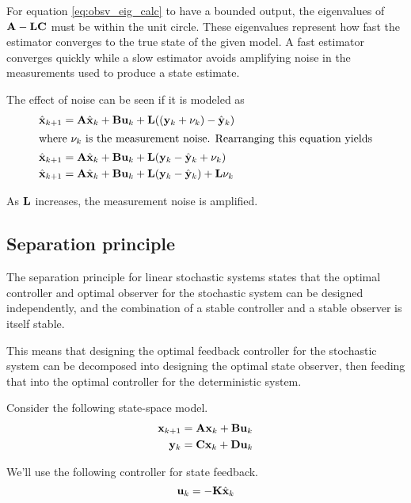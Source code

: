For equation \eqref{eq:obsv_eig_calc} to have a bounded output, the eigenvalues
of $\mathbf{A} - \mathbf{L}\mathbf{C}$ must be within the unit circle. These eigenvalues
represent how fast the estimator converges to the true \gls{state} of the given
\gls{model}. A fast estimator converges quickly while a slow estimator avoids
amplifying noise in the measurements used to produce a \gls{state} estimate.

The effect of noise can be seen if it is modeled
 as
\begin{align*}
  \hat{\mathbf{x}}_{k+1} &= \mathbf{A}\hat{\mathbf{x}}_k + \mathbf{B}\mathbf{u}_k +
    \mathbf{L} ((\mathbf{y}_k + \mathbf{\nu}_k) - \hat{\mathbf{y}}_k) \\
  \intertext{where $\mathbf{\nu}_k$ is the measurement noise. Rearranging this
    equation yields}
  \hat{\mathbf{x}}_{k+1} &= \mathbf{A}\hat{\mathbf{x}}_k + \mathbf{B}\mathbf{u}_k +
    \mathbf{L} (\mathbf{y}_k - \hat{\mathbf{y}}_k + \mathbf{\nu}_k) \\
  \hat{\mathbf{x}}_{k+1} &= \mathbf{A}\hat{\mathbf{x}}_k + \mathbf{B}\mathbf{u}_k +
    \mathbf{L} (\mathbf{y}_k - \hat{\mathbf{y}}_k) + \mathbf{L}\mathbf{\nu}_k
\end{align*}

As $\mathbf{L}$ increases, the measurement noise is amplified.

\subsection{Separation principle}

The separation principle for linear stochastic systems states that the optimal
controller and optimal observer for the stochastic system can be designed
independently, and the combination of a stable controller and a stable observer
is itself stable.

This means that designing the optimal feedback controller for the stochastic
system can be decomposed into designing the optimal state observer, then feeding
that into the optimal controller for the deterministic system.

Consider the following state-space model.
\begin{align*}
  \mathbf{x}_{k+1} &= \mathbf{A}\mathbf{x}_k + \mathbf{B}\mathbf{u}_k \\
  \mathbf{y}_k &= \mathbf{C}\mathbf{x}_k + \mathbf{D}\mathbf{u}_k
\end{align*}

We'll use the following controller for state feedback.
\begin{equation*}
  \mathbf{u}_k = -\mathbf{K}\hat{\mathbf{x}}_k
\end{equation*}

